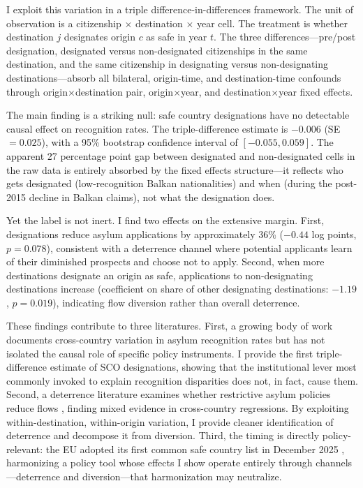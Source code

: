 \documentclass[12pt]{article}
\begin{document}
I exploit this variation in a triple difference-in-differences framework. The unit of observation is a citizenship $\times$ destination $\times$ year cell. The treatment is whether destination $j$ designates origin $c$ as safe in year $t$. The three differences---pre/post designation, designated versus non-designated citizenships in the same destination, and the same citizenship in designating versus non-designating destinations---absorb all bilateral, origin-time, and destination-time confounds through origin$\times$destination pair, origin$\times$year, and destination$\times$year fixed effects.

The main finding is a striking null: safe country designations have no detectable causal effect on recognition rates. The triple-difference estimate is $-0.006$ (SE $= 0.025$), with a 95\% bootstrap confidence interval of $[-0.055, 0.059]$. The apparent 27 percentage point gap between designated and non-designated cells in the raw data is entirely absorbed by the fixed effects structure---it reflects who gets designated (low-recognition Balkan nationalities) and when (during the post-2015 decline in Balkan claims), not what the designation does.

Yet the label is not inert. I find two effects on the extensive margin. First, designations reduce asylum applications by approximately 36\% ($-0.44$ log points, $p = 0.078$), consistent with a deterrence channel where potential applicants learn of their diminished prospects and choose not to apply. Second, when more destinations designate an origin as safe, applications to non-designating destinations increase (coefficient on share of other designating destinations: $-1.19$, $p = 0.019$), indicating flow diversion rather than overall deterrence.

These findings contribute to three literatures. First, a growing body of work documents cross-country variation in asylum recognition rates \citep{neumayer2005asylum, hatton2009rise, toshkov2014asylum, ruedin2019asylum} but has not isolated the causal role of specific policy instruments. I provide the first triple-difference estimate of SCO designations, showing that the institutional lever most commonly invoked to explain recognition disparities does not, in fact, cause them. Second, a deterrence literature examines whether restrictive asylum policies reduce flows \citep{hatton2004seeking, thielemann2006beyond, czaika2009effectiveness, ortega2013effect}, finding mixed evidence in cross-country regressions. By exploiting within-destination, within-origin variation, I provide cleaner identification of deterrence and decompose it from diversion. Third, the timing is directly policy-relevant: the EU adopted its first common safe country list in December 2025 \citep{eucouncil2025pact}, harmonizing a policy tool whose effects I show operate entirely through channels---deterrence and diversion---that harmonization may neutralize.
\end{document}
